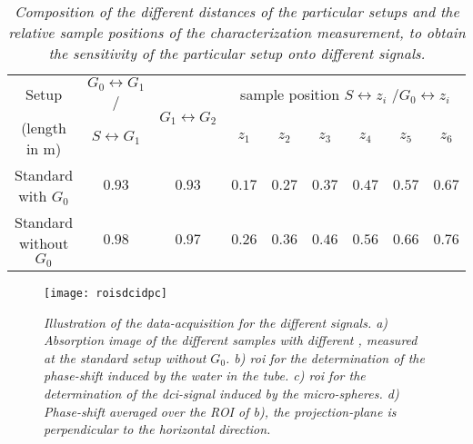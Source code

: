 \begin{table}[h] 
	\begin{center}	
		\begin{tabular}{c|c||c|c||c|c|c|c|c|c}
			\multicolumn{2}{c||}{Setup}\rule{0pt}{13pt}	& $G_{0}\leftrightarrow G_{1}$/ & \multirow{2}{17 mm}{ $G_{1}\leftrightarrow G_{2}$}& \multicolumn{6}{c}{sample position $S\leftrightarrow z_{i}$ /$G_{0} \leftrightarrow z_{i}$} \\ \cline{5-10} 
			\multicolumn{2}{c||}{(length in m)}\rule{0pt}{13pt} & $S\leftrightarrow G_{1}$ &  & $z_{1}$ & $z_{2}$ & $z_{3}$ & $z_{4}$ & $ z_{5}$& $z_{6}$ \\ \hline \hline
			\multicolumn{2}{c||}{Standard with $G_{0}$ }\rule{0pt}{13pt} & $0.93$ & $0.93$ &$0.17$ & $0.27$ & $0.37$ & $0.47$ &$0.57$ &$0.67$  \\ \cline{2-10}
			\multicolumn{2}{c||}{Standard without $G_{0}$ }\rule{0pt}{13pt} & $0.98$ & $0.97$& $0.26$ & $0.36$ & $0.46$ & $0.56$ & $0.66$& $0.76$\\ \cline{2-10}	  
		\end{tabular}
		\caption[Composition of the different setup properties and relative sample positions]{\textit{Composition of the different distances of the particular setups and the relative sample positions of the characterization measurement, to obtain the sensitivity of the particular setup onto different signals.}}
		\label{table:setupcomp}
	\end{center}    
\end{table} 

\begin{figure}%
	\begin{center}
		\texttt{[image: roisdcidpc]}
	\end{center}
	\caption[Illustration of different sample ROI's to obtain the DPC and DCI signal]{\textit{Illustration of the data-acquisition for the different signals. a) Absorption image of the different samples with different , measured at the standard setup without $G_{0}$. b) \acrshort{roi} for the determination of the phase-shift induced by the water in the tube. c) \acrshort{roi} for the determination of the \gls{dci}-signal induced by the micro-spheres. d) Phase-shift averaged over the ROI of b), the projection-plane is perpendicular to the horizontal direction.}}
	\label{lineplotphase}
\end{figure} 
